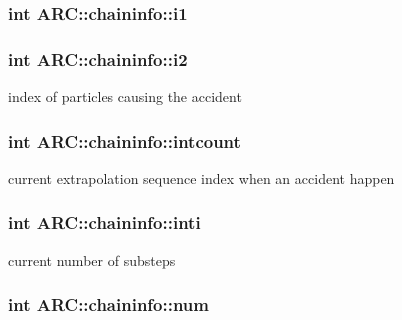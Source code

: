 \subsubsection[{\texorpdfstring{i1}{i1}}]{\setlength{\rightskip}{0pt plus 5cm}int A\+R\+C\+::chaininfo\+::i1}\hypertarget{classARC_1_1chaininfo_a50deb77aefe8f664d65f7320098d4726}{}\label{classARC_1_1chaininfo_a50deb77aefe8f664d65f7320098d4726}
\subsubsection[{\texorpdfstring{i2}{i2}}]{\setlength{\rightskip}{0pt plus 5cm}int A\+R\+C\+::chaininfo\+::i2}\hypertarget{classARC_1_1chaininfo_a60f94a1f01c83934ad975f5d82638ef1}{}\label{classARC_1_1chaininfo_a60f94a1f01c83934ad975f5d82638ef1}


index of particles causing the accident 

\subsubsection[{\texorpdfstring{intcount}{intcount}}]{\setlength{\rightskip}{0pt plus 5cm}int A\+R\+C\+::chaininfo\+::intcount}\hypertarget{classARC_1_1chaininfo_a0bd3d3a4b97bba8fa1baea9f077f30a7}{}\label{classARC_1_1chaininfo_a0bd3d3a4b97bba8fa1baea9f077f30a7}


current extrapolation sequence index when an accident happen 

\subsubsection[{\texorpdfstring{inti}{inti}}]{\setlength{\rightskip}{0pt plus 5cm}int A\+R\+C\+::chaininfo\+::inti}\hypertarget{classARC_1_1chaininfo_ab043612acf18c1c850737f67bcb6e141}{}\label{classARC_1_1chaininfo_ab043612acf18c1c850737f67bcb6e141}


current number of substeps 

\subsubsection[{\texorpdfstring{num}{num}}]{\setlength{\rightskip}{0pt plus 5cm}int A\+R\+C\+::chaininfo\+::num}\hypertarget{classARC_1_1chaininfo_a4c85d251b74ed69a458e1b33b9f1173c}{}\label{classARC_1_1chaininfo_a4c85d251b74ed69a458e1b33b9f1173c}


